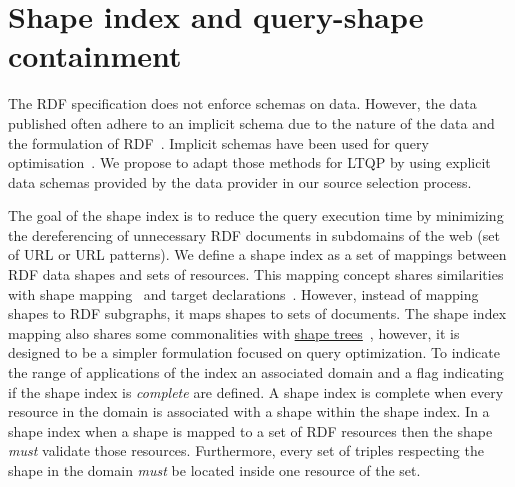 \section{Shape index and query-shape containment}




The RDF specification does not enforce schemas on data.
However, the data published often adhere to an implicit schema due to the nature of the data and the formulation of RDF~\cite{Neumann2011CharacteristicSA}.
Implicit schemas have been used for query optimisation~\cite{Neumann2011CharacteristicSA, Meimaris2018HierarchicalCS}.
We propose to adapt those methods for LTQP by using explicit data schemas provided by the data provider in our source selection process.

The goal of the shape index is to reduce the query execution time by minimizing the dereferencing of unnecessary RDF documents in subdomains of the web (set of URL or URL patterns).
We define a shape index as a set of mappings between RDF data shapes and sets of resources.
This mapping concept shares similarities with shape mapping~\cite{Gayo2018} and target declarations~\cite{Gayo2018Shacl}.
However, instead of mapping shapes to RDF subgraphs, it maps shapes to sets of documents.
The shape index mapping also shares some commonalities with \href{https://shapetrees.org/}{shape trees}~, however, it is designed to be a simpler formulation focused on query optimization.
To indicate the range of applications of the index an associated domain and a flag indicating if the shape index is \emph{complete} are defined.
A shape index is complete when every resource in the domain is associated with a shape within the shape index.
In a shape index when a shape is mapped to a set of RDF resources then the shape \emph{must} validate those resources.
Furthermore, every set of triples respecting the shape in the domain \emph{must} be located inside one resource of the set.

